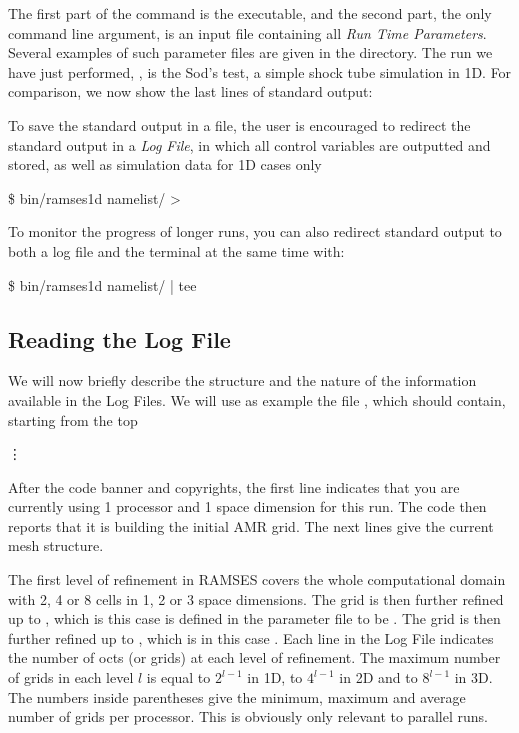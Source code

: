 The first part of the command is the executable, and the second part, the only
command line argument, is an input file containing all \emph{Run Time
Parameters}. Several examples of such parameter files are given in the
 directory. The run we have just performed, \cmd{\nmlfilename},
is the Sod's test, a simple shock tube simulation in 1D. For comparison, we now
show the last {\lastlinescount} lines of standard output:


To save the standard output in a file, the user is encouraged to
redirect the standard output in a \emph{Log File}, in which all
control variables are outputted and stored, as well as simulation data
for 1D cases only

\begin{Prompt}
\$ bin/ramses1d namelist/{\nmlfilename} > {\logfilename}
\end{Prompt}
%
To monitor the progress of longer runs, you can also redirect standard output
to both a log file and the terminal at the same time with:
%
\begin{Prompt}
\$ bin/ramses1d namelist/{\nmlfilename} | tee {\logfilename}
\end{Prompt}

\clearpage %
\subsection{Reading the Log File}
We will now briefly describe the structure and the nature of the
information available in the Log Files. We will use as example the file
\cmd{\logfilename}, which should contain, starting from the top

%
\hskip 2cm \vdots
%

After the code banner and copyrights, the first line indicates that you are
currently using 1 processor and 1 space dimension for this run. The code then
reports that it is building the initial AMR grid. The next lines give the
current mesh structure.

The first level of refinement in RAMSES covers the whole computational domain
with 2, 4 or 8 cells in 1, 2 or 3 space dimensions. The grid is then further
refined up to , which is this case is defined in the
parameter file to be .  The grid is then further
refined up to , which is in this case
. Each line in the Log File indicates the number
of octs (or grids) at each level of refinement. The maximum number of grids in
each level $l$ is equal to $2^{l-1}$ in 1D, to $4^{l-1}$ in 2D and to $8^{l-1}$
in 3D. The numbers inside parentheses give the minimum, maximum and average
number of grids per processor. This is obviously only relevant to parallel
runs.

